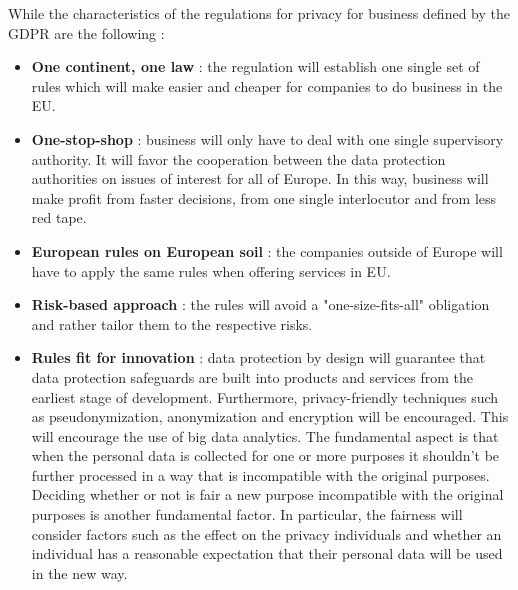 While the characteristics of the regulations for privacy for business defined by the GDPR are the following :
\begin{itemize}
\item \textbf{One continent, one law} : the regulation will establish one single set of rules which will make easier and cheaper for companies to do business in the EU.
\item \textbf{One-stop-shop} : business will only have to deal with one single supervisory authority. It will favor the cooperation between the data protection authorities on issues of interest for all of Europe. In this way, business will make profit from faster decisions, from one single interlocutor and from less red tape.
\item \textbf{European rules on European soil} : the companies outside of Europe will have to apply the same rules when offering services in EU.
\item \textbf{Risk-based approach} : the rules will avoid a "one-size-fits-all" obligation and rather tailor them to the respective risks.
\item \textbf{Rules fit for innovation} : data protection by design will guarantee that data protection safeguards are built into products and services from the earliest stage of development. Furthermore, privacy-friendly techniques such as pseudonymization, anonymization and encryption will be encouraged. This will encourage the use of big data analytics. The fundamental aspect is that when the personal data is collected for one or more purposes it shouldn't be further processed in a way that is incompatible with the original purposes. Deciding whether or not is fair a new purpose incompatible with the original purposes is another fundamental factor. In particular, the fairness will consider factors such as the effect on the privacy individuals and whether an individual has a reasonable expectation that their personal data will be used in the new way.
\end{itemize}

